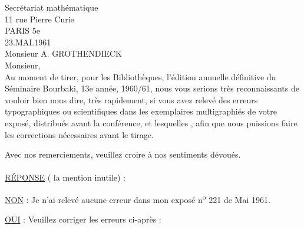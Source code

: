 
Secrétariat mathématique\\
11 rue Pierre Curie\\
PARIS 5e\\

23.MAI.1961\\

Monsieur A. GROTHENDIECK\\

Monsieur,\\

Au moment de tirer, pour les Bibliothèques, l'édition annuelle définitive du Séminaire Bourbaki, 13e année, 1960/61, nous vous serions très reconnaissants de vouloir bien nous dire, très rapidement, si vous avez relevé des erreurs typographiques ou scientifiques dans les exemplaires multigraphiés de votre exposé, distribués avant la conférence, et lesquelles , afin que nous puissions faire les corrections nécessaires avant le tirage.

Avec nos remerciements, veuillez croire à nos sentiments dévoués.\\

\\

\uline{RÉPONSE} ( la mention inutile) :

\uline{NON} : Je n'ai relevé aucune erreur dans mon exposé n\textsuperscript{o} 221 de Mai 1961.

\uline{OUI} : Veuillez corriger les erreurs ci-après :


